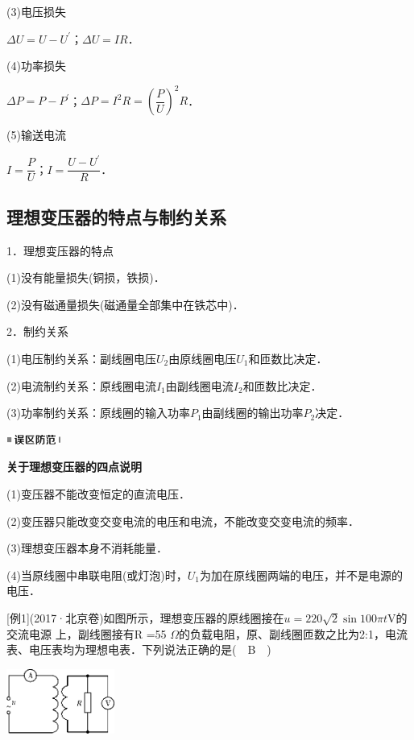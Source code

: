 \documentclass[cn,10.5pt,chinese,mac,chinesefont=founder]{elegantbook}
\begin{document}
(3)电压损失

$\Delta U=U-U^\prime$；$\Delta U=IR$．

(4)功率损失

$\Delta P=P-P^\prime$；$\Delta P=I^2R=(\dfrac{P}{U})^2R$．

(5)输送电流

$I=\dfrac{P}{U}$；$I=\dfrac{U-U^\prime}{R}$．
\newpage
\subsection{理想变压器的特点与制约关系}

1．理想变压器的特点

(1)没有能量损失(铜损，铁损)．

(2)没有磁通量损失(磁通量全部集中在铁芯中)．

2．制约关系

(1)电压制约关系：副线圈电压$U_2$由原线圈电压$U_1$和匝数比决定．

(2)电流制约关系：原线圈电流$I_1$由副线圈电流$I_2$和匝数比决定．

(3)功率制约关系：原线圈的输入功率$P_1$由副线圈的输出功率$P_2$决定．

\begin{center}\includegraphics[width=0.70764in,height=0.12292in]{media/image34.png}\end{center}
\begin{center}
	\textbf{关于理想变压器的四点说明}
\end{center}

(1)变压器不能改变恒定的直流电压．

(2)变压器只能改变交变电流的电压和电流，不能改变交变电流的频率．

(3)理想变压器本身不消耗能量．

(4)当原线圈中串联电阻(或灯泡)时，$U_1$为加在原线圈两端的电压，并不是电源的电压．

{[}例1{]}(2017·北京卷)如图所示，理想变压器的原线圈接在$u=220 \sqrt{2} \sin 100 \pi t \mathrm{V}$的交流电源
上，副线圈接有R =55
$\Omega$的负载电阻，原、副线圈匝数之比为2:1，电流表、电压表均为理想电表．下列说法正确的是(　B　)
\begin{center}\includegraphics[width=1.39653in,height=0.83958in]{media/image451.png}\end{center}
\end{document}
